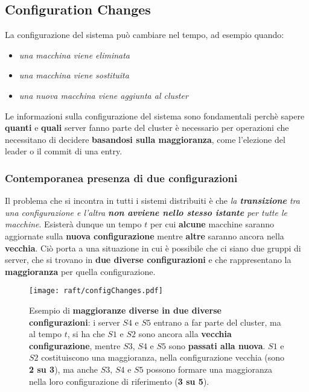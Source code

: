\subsection{Configuration Changes}
La configurazione del sistema può cambiare nel tempo, ad esempio quando:
  \begin{itemize}
    \item{\emph{una macchina viene eliminata}}
    \item{\emph{una macchina viene sostituita}}
    \item{\emph{una nuova macchina viene aggiunta al cluster}}
  \end{itemize}

Le informazioni sulla configurazione del sistema sono fondamentali perchè sapere \textbf{quanti} e \textbf{quali} server fanno parte del cluster è necessario per operazioni che necessitano di decidere \textbf{basandosi sulla maggioranza}, come l'elezione del leader o il commit di una entry.

\subsubsection{Contemporanea presenza di due configurazioni}
  Il problema che si incontra in tutti i sistemi distribuiti è che \textit{la \textbf{transizione} tra una configurazione e l'altra \textbf{non avviene nello stesso istante} per tutte le macchine}. Esisterà dunque un tempo $t$ per cui \textbf{alcune} macchine saranno aggiornate sulla \textbf{nuova configurazione} mentre \textbf{altre} saranno ancora nella \textbf{vecchia}. Ciò porta a una situazione in cui è possibile che ci siano due gruppi di server, che si trovano in \textbf{due diverse configurazioni} e che rappresentano la \textbf{maggioranza} per quella configurazione.

  \begin{figure}[H]
    \centering
    \texttt{[image: raft/configChanges.pdf]}
    \caption{Esempio di \textbf{maggioranze diverse in due diverse configurazioni}: i server $S4$ e $S5$ entrano a far parte del cluster, ma al tempo $t$, si ha che $S1$ e $S2$ sono ancora alla \textbf{vecchia configurazione}, mentre $S3$, $S4$ e $S5$ sono \textbf{passati alla nuova}.
    $S1$ e $S2$ costituiscono una maggioranza, nella configurazione vecchia (sono \textbf{2 su 3}), ma anche $S3$, $S4$ e $S5$ possono formare una maggioranza nella loro configurazione di riferimento (\textbf{3 su 5}). }
    \label{fig:figure 8}
  \end{figure}


